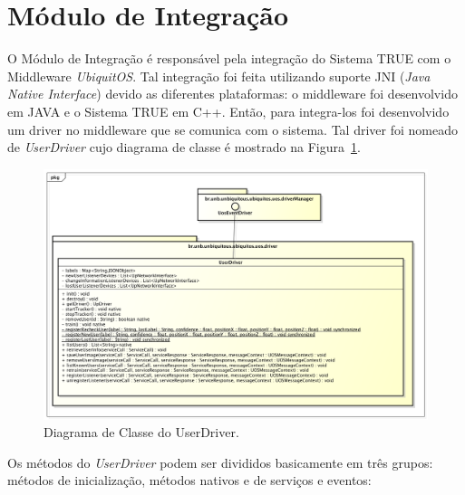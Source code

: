 \section{Módulo de Integração}

O Módulo de Integração é responsável pela integração do Sistema TRUE  com o Middleware \textit{UbiquitOS}. Tal integração 
foi feita utilizando suporte JNI (\textit{Java Native Interface}) devido as diferentes plataformas: o middleware foi desenvolvido em JAVA e o Sistema TRUE em C++. Então, para integra-los foi desenvolvido um driver no middleware que se comunica com o sistema. Tal driver foi nomeado de \textit{UserDriver} cujo diagrama de classe é mostrado na Figura~\ref{fig:userdriver}.

	\begin{figure}[hbt]
		\begin{center}
			\includegraphics[scale=0.45]{figuras/4.ProblemaEProposta/diagrama-classe-userdriver.png}
		\end{center}
		\caption{Diagrama de Classe do UserDriver.}
		\label{fig:userdriver}
	\end{figure}

Os métodos do \textit{UserDriver} podem ser divididos basicamente em três grupos: métodos de inicialização, métodos nativos e de serviços e eventos:

